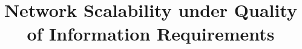 \documentclass[conference]{IEEEtran}
\begin{document}
%
\title{Network Scalability under Quality of Information Requirements}

\IEEEoverridecommandlockouts




%
\end{document}
